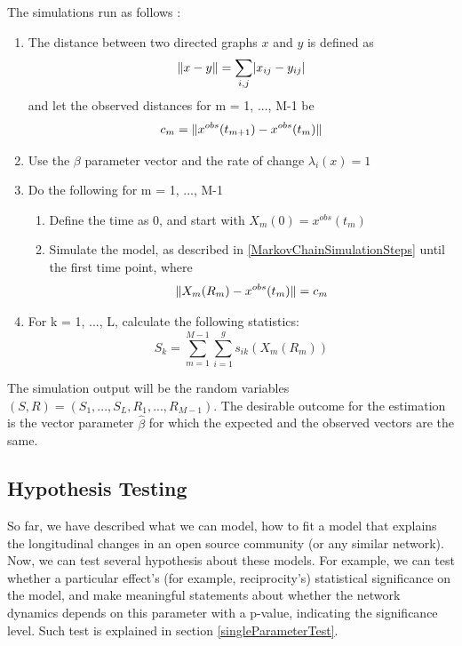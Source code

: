 \documentclass[11pt]{report}
\DeclarePairedDelimiter{\abs}{\lvert}{\rvert}
\DeclarePairedDelimiter{\norm}{\lVert}{\rVert}
\begin{document}
The simulations run as follows \cite{Snijders2004}:
\begin{enumerate}
\item The distance between two directed graphs $x$ and $y$ is defined as
\begin{equation}
\norm{x -y} = \sum_{i,j}\abs{x_{ij} - y_{ij}}
\end{equation}
and let the observed distances for m = 1, ..., M-1 be 
\begin{equation}
c_m = \norm{x^{obs}(t_{m+1})-x^{obs}(t_m)}
\end{equation}
\item Use the $\beta$ parameter vector and the rate of change $\lambda_{i}(x) = 1$

\item Do the following for m = 1, ..., M-1
\begin{enumerate}
\item Define the time as 0, and start with $X_m(0) = x^{obs}(t_m)$
\item Simulate the model, as described in \ref{MarkovChainSimulationSteps} until the first time point, where 
\begin{equation}
\norm{X_m(R_m) - x^{obs}(t_m)} = c_m
\end{equation}
\end{enumerate}
\item For k = 1, ..., L, calculate the following statistics:
\begin{equation}
S_k = \sum_{m = 1}^{M-1}\sum_{i=1}^{g}s_{ik}(X_m(R_m))
\end{equation}
\end{enumerate}

The simulation output will be the random variables $(S,R) = (S_1,...,S_L,R_1,...,R_{M-1})$. The desirable outcome for the estimation is the vector parameter $\hat{\beta}$ for which the expected and the observed vectors are the same. 

\subsection{Hypothesis Testing}
So far, we have described what we can model, how to fit a model that explains the longitudinal changes in an open source community (or any similar network). Now, we can test several hypothesis about these models. For example, we can test whether a particular effect's (for example, reciprocity's) statistical significance on the model, and make meaningful statements about whether the network dynamics depends on this parameter with a p-value, indicating the significance level. Such test is explained in section \ref{singleParameterTest}.
\end{document}
